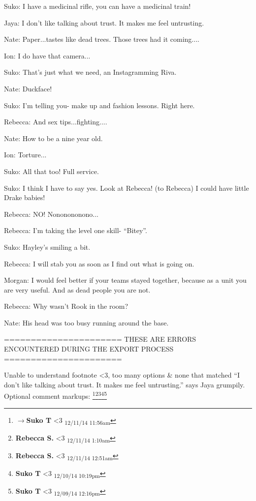 Suko: I have a medicinal rifle, you can have a medicinal train!



Jaya: I don't like talking about trust. It makes me feel untrusting.



Nate: Paper...tastes like dead trees.  Those trees had it coming....



Ion: I do have that camera...

Suko: That's just what we need, an Instagramming Riva.

Nate: Duckface!



Suko: I'm telling you- make up and fashion lessons.  Right here.

Rebecca: And sex tips...fighting....

Nate: How to be a nine year old.

Ion: Torture...

Suko: All that too!  Full service.



Suko: I think I have to say yes.  Look at Rebecca!  (to Rebecca) I could have little Drake babies!

Rebecca: NO!  Nononononono...



Rebecca: I'm taking the level one skill- ``Bitey''.



Suko: Hayley's smiling a bit.

Rebecca: I will stab you as soon as I find out what is going on.



Morgan:  I would feel better if your teams stayed together, because as a unit you are very useful.  And as dead people you are not.



Rebecca: Why wasn't Rook in the room?

Nate: His head was too busy running around the base.


\iffalse

======================
THESE ARE ERRORS ENCOUNTERED DURING THE EXPORT PROCESS
======================

	Unable to understand footnote <3, too many options & none that matched “I don’t like talking about trust. It makes me feel untrusting.” says Jaya grumpily. Optional comment markups: \footnote{$\rightarrow$\textbf{Suko T }<3 \textsubscript{12/11/14 11:56am}}\footnote{\textbf{Rebecca S. }<3 \textsubscript{12/11/14 1:10am}}\footnote{\textbf{Rebecca S. }<3 \textsubscript{12/11/14 12:51am}}\footnote{\textbf{Suko T }<3 \textsubscript{12/10/14 10:19pm}}\footnote{\textbf{Suko T }<3 \textsubscript{12/09/14 12:16pm}} 

